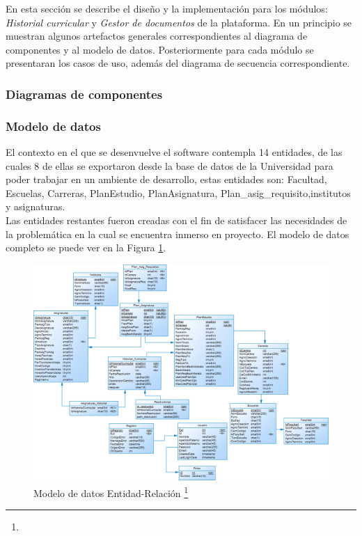 	En esta sección se describe el diseño y la implementación para los módulos: \textit{Historial curricular} y \textit{Gestor de documentos} de la plataforma. En un principio se muestran algunos artefactos generales correspondientes al diagrama de componentes y al modelo de datos. Posteriormente para cada módulo se presentaran los casos de uso, además del diagrama de secuencia correspondiente.


	\subsubsection{Diagramas de componentes}
	\subsubsection{Modelo de datos}
	
	El contexto en el que se desenvuelve el software contempla 14 entidades, de las cuales 8 de ellas se exportaron desde la base de datos de la Universidad para poder trabajar en un ambiente de desarrollo, estas entidades son: Facultad, Escuelas, Carreras, PlanEstudio, PlanAsignatura, Plan\_asig\_requisito,institutos y asignaturas.
	\\
	
	Las entidades restantes fueron creadas con el fin de satisfacer las necesidades de la problemática en la cual se encuentra inmerso en proyecto. El modelo de datos completo se puede ver en la Figura \ref{Modelo_E_R}.
	\\
	
	\begin{figure}[H]
		\centering
		\includegraphics[width=1\textwidth]{images/Capitulo_3/Modelo_E_R.png}
		\caption[Modelo de datos Entidad-Relación]{Modelo de datos Entidad-Relación \footnote{}}
		\label{Modelo_E_R}
	\end{figure}
